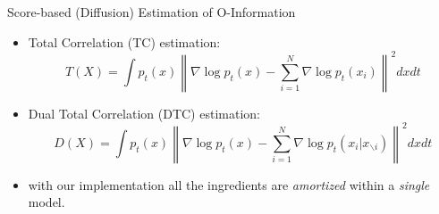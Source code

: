 \begin{frame}{Score-based (Diffusion) Estimation of O-Information}

    \begin{itemize}
        \item Total Correlation (TC) estimation:
        \begin{equation}
            T(X) = \int p_t(x) \left\| \nabla \log p_t(x) - \sum_{i=1}^{N} \nabla \log p_t(x_i) \right\|^2 dx dt
        \end{equation}
        \item Dual Total Correlation (DTC) estimation:
        \begin{equation}
            D(X) = \int p_t(x) \left\| \nabla \log p_t(x) - \sum_{i=1}^{N} \nabla \log p_t(x_i | x_{\backslash i}) \right\|^2 dx dt
        \end{equation}
        \item with our implementation all the ingredients are \textit{amortized} within a \textit{single} model.
    \end{itemize}
\end{frame}
    



